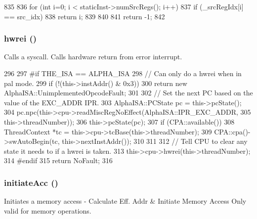 \begin{DoxyCode}
835     {
836         for (int i=0; i < staticInst->numSrcRegs(); i++) {
837             if (_srcRegIdx[i] == src_idx)
838                 return i;
839         }
840 
841         return -1;
842     }
\end{DoxyCode}
\hypertarget{classInOrderDynInst_a5f42e07ae335dff417664e91518c7f1e}{
\subsubsection[{hwrei}]{ hwrei ()}}
\label{classInOrderDynInst_a5f42e07ae335dff417664e91518c7f1e}
Calls a syscall. Calls hardware return from error interrupt. 


\begin{DoxyCode}
296 {
297 #if THE_ISA == ALPHA_ISA
298     // Can only do a hwrei when in pal mode.
299     if (!(this->instAddr() & 0x3))
300         return new AlphaISA::UnimplementedOpcodeFault;
301 
302     // Set the next PC based on the value of the EXC_ADDR IPR.
303     AlphaISA::PCState pc = this->pcState();
304     pc.npc(this->cpu->readMiscRegNoEffect(AlphaISA::IPR_EXC_ADDR,
305                                           this->threadNumber));
306     this->pcState(pc);
307     if (CPA::available()) {
308         ThreadContext *tc = this->cpu->tcBase(this->threadNumber);
309         CPA::cpa()->swAutoBegin(tc, this->nextInstAddr());
310     }
311 
312     // Tell CPU to clear any state it needs to if a hwrei is taken.
313     this->cpu->hwrei(this->threadNumber);
314 #endif
315     return NoFault;
316 }
\end{DoxyCode}
\hypertarget{classInOrderDynInst_af8310f8618e710a06b0c2cbface6ac72}{
\subsubsection[{initiateAcc}]{ initiateAcc ()}}
\label{classInOrderDynInst_af8310f8618e710a06b0c2cbface6ac72}
Initiates a memory access -\/ Calculate Eff. Addr \& Initiate Memory Access Only valid for memory operations. 



